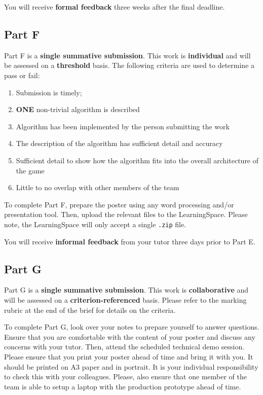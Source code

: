 \documentclass{../fal_assignment}
\begin{document}
You will receive \textbf{formal feedback} three weeks after the final deadline.

\subsection*{Part F}

Part F is a \textbf{single summative submission}. This work is \textbf{individual} and will be assessed on a \textbf{threshold} basis. The following criteria are used to determine a pass or fail:

\begin{enumerate}[label=(\alph*)]
	\item Submission is timely;
	\item \textbf{ONE} non-trivial algorithm is described
	\item Algorithm has been implemented by the person submitting the work
	\item The description of the algorithm has sufficient detail and accuracy
	\item Sufficient detail to show how the algorithm fits into the overall architecture of the game
	\item Little to no overlap with other members of the team
\end{enumerate}

To complete Part F, prepare the poster using any word processing and/or presentation tool. Then, upload the relevant files to the LearningSpace. Please note, the LearningSpace will only accept a single \texttt{.zip} file.

You will receive \textbf{informal feedback} from your tutor three days prior to Part E.

\subsection*{Part G}

Part G is a \textbf{single summative submission}. This work is \textbf{collaborative} and will be assessed on a \textbf{criterion-referenced} basis. Please refer to the marking rubric at the end of the brief for details on the criteria.

To complete Part G, look over your notes to prepare yourself to answer questions. Ensure that you are comfortable with the content of your poster and discuss any concerns with your tutor. Then, attend the scheduled technical demo session. Please ensure that you print your poster ahead of time and bring it with you. It should be printed on A3 paper and in portrait. It is your individual responsibility to check this with your colleagues. Please, also ensure that one member of the team is able to setup a laptop with the production prototype ahead of time.
\end{document}
